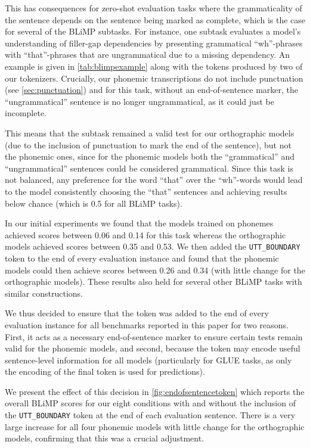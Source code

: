 This has consequences for zero-shot evaluation tasks where the grammaticality of the sentence depends on the sentence being marked as complete, which is the case for several of the BLiMP subtasks. For instance, one subtask evaluates a model's understanding of filler-gap dependencies by presenting grammatical ``wh''-phrases with ``that''-phrases that are ungrammatical due to a missing dependency. An example is given in \cref{tab:blimpexample} along with the tokens produced by two of our tokenizers. Crucially, our phonemic transcriptions do not include punctuation (see \cref{sec:punctuation}) and for this task, without an end-of-sentence marker, the ``ungrammatical'' sentence is no longer ungrammatical, as it could just be incomplete.

This means that the subtask remained a valid test for our orthographic models (due to the inclusion of punctuation to mark the end of the sentence), but not the phonemic ones, since for the phonemic models both the ``grammatical'' and ``ungrammatical'' sentences could be considered grammatical. Since this task is not balanced, any preference for the word ``that'' over the ``wh''-words would lead to the model consistently choosing the ``that'' sentences and achieving results below chance (which is 0.5 for all BLiMP tasks).

In our initial experiments we found that the models trained on phonemes achieved scores between 0.06 and 0.14 for this task whereas the orthographic models achieved scores between 0.35 and 0.53. We then added the \texttt{UTT\_BOUNDARY} token to the end of every evaluation instance and found that the phonemic models could then achieve scores between 0.26 and 0.34 (with little change for the orthographic models). These results also held for several other BLiMP tasks with similar constructions. 

We thus decided to ensure that the token was added to the end of every evaluation instance for all benchmarks reported in this paper for two reasons. First, it acts as a necessary end-of-sentence marker to ensure certain tests remain valid for the phonemic models, and second, because the token may encode useful sentence-level information for all models (particularly for GLUE tasks, as only the encoding of the final token is used for predictions).

We present the effect of this decision in \cref{fig:endofsentencetoken} which reports the overall BLiMP scores for our eight conditions with and without the inclusion of the \texttt{UTT\_BOUNDARY} token at the end of each evaluation sentence. There is a very large increase for all four phonemic models with little change for the orthographic models, confirming that this was a crucial adjustment.

